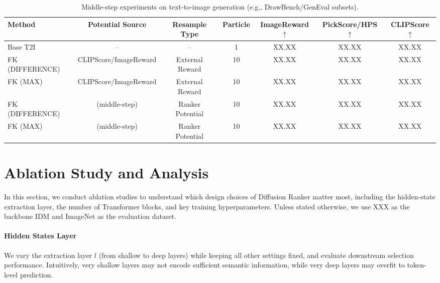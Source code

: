 \documentclass{article}
\newcommand{\method}{\text{Diffusion Ranker}\xspace}
\begin{document}
\begin{table}[htbp]
\centering
\caption{Middle-step experiments on text-to-image generation (e.g., DrawBench/GenEval subsets).}
\label{tab:midstep_t2i_template}
\begin{tabular}{lcccccc}
\toprule
Method & Potential Source & Resample Type & Particle & ImageReward$\uparrow$ & PickScore/HPS$\uparrow$ & CLIPScore$\uparrow$ \\
\midrule
Base T2I & -- & -- & 1 & XX.XX & XX.XX & XX.XX \\
FK (DIFFERENCE) & CLIPScore/ImageReward & External Reward & 10 & XX.XX & XX.XX & XX.XX \\
FK (MAX) & CLIPScore/ImageReward & External Reward & 10 & XX.XX & XX.XX & XX.XX \\
FK (DIFFERENCE) & \method (middle-step) & Ranker Potential & 10 & XX.XX & XX.XX & XX.XX \\
FK (MAX) & \method (middle-step) & Ranker Potential & 10 & XX.XX & XX.XX & XX.XX \\
\bottomrule
\end{tabular}
\end{table}

\section{Ablation Study and Analysis}
\label{sec:ablation}

In this section, we conduct ablation studies to understand which design choices of Diffusion Ranker matter most, including the hidden-state extraction layer, the number of Transformer blocks, and key training hyperparameters. Unless stated otherwise, we use XXX as the backbone IDM and ImageNet as the evaluation dataset.

\paragraph{Hidden States Layer}
We vary the extraction layer $l$ (from shallow to deep layers) while keeping all other settings fixed, and evaluate downstream selection performance. Intuitively, very shallow layers may not encode sufficient semantic information, while very deep layers may overfit to token-level prediction. 
\end{document}
